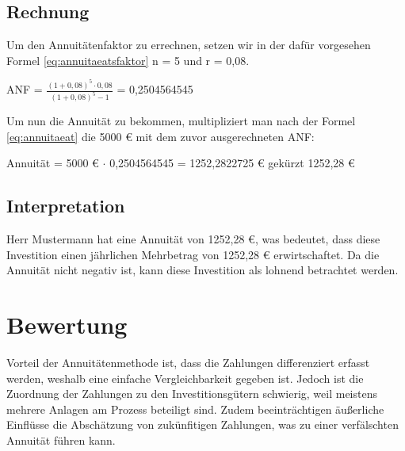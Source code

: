 \subsection{Rechnung}

Um den Annuitätenfaktor zu errechnen, setzen wir in der dafür vorgesehen Formel \eqref{eq:annuitaeatsfaktor} n = 5 und r = 0,08.

\bigskip

ANF = $\frac{ (1 + 0,08)^5 \cdot 0,08 }{ (1 + 0,08)^5 - 1 }$ = 0,2504564545

\bigskip

\noindent
Um nun die Annuität zu bekommen, multipliziert man nach der Formel \eqref{eq:annuitaeat} die 5000 € mit dem zuvor ausgerechneten ANF:

\bigskip

Annuität = 5000 € $\cdot$ 0,2504564545 = 1252,2822725 € gekürzt 1252,28 €

\subsection{Interpretation}

Herr Mustermann hat eine Annuität von 1252,28 €, was bedeutet, dass diese Investition einen jährlichen Mehrbetrag von 1252,28 € erwirtschaftet. Da die Annuität nicht negativ ist, kann diese Investition als lohnend betrachtet werden.

\section{Bewertung}

Vorteil der Annuitätenmethode ist, dass die Zahlungen differenziert erfasst werden, weshalb eine einfache Vergleichbarkeit gegeben ist. Jedoch ist die Zuordnung der Zahlungen zu den Investitionsgütern schwierig, weil meistens mehrere Anlagen am Prozess beteiligt sind. Zudem beeinträchtigen äußerliche Einflüsse die Abschätzung von zukünfitigen Zahlungen, was zu einer verfälschten Annuität führen kann. 

